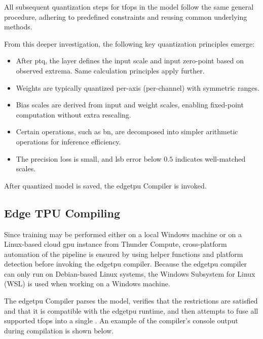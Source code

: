 {All subsequent quantization steps for \glspl{tfop} in the model follow the same general procedure, adhering to predefined constraints and reusing common underlying methods.

From this deeper investigation, the following key quantization principles emerge:
\begin{itemize}
    \item After \gls{ptq}, the  layer defines the input scale and input zero-point based on observed extrema.
    Same calculation principles apply further.
    \item Weights are typically quantized per-axis (per-channel) with symmetric ranges.
    \item Bias scales are derived from input and weight scales, enabling fixed-point computation without extra rescaling.
    \item Certain operations, such as \gls{bn}, are decomposed into simpler arithmetic operations for inference efficiency.
    \item The precision loss is small, and \gls{lsb} error below $0.5$ indicates well-matched scales.
\end{itemize}

After quantized model is saved, the \gls{edgetpu} Compiler is invoked.

\clearpage
\subsection{Edge TPU Compiling}

Since training may be performed either on a local Windows machine or on a Linux-based cloud \gls{gpu} instance from Thunder Compute,
cross-platform automation of the pipeline is ensured by using helper functions and platform detection before invoking the \gls{edgetpu} compiler.
Because the \gls{edgetpu} compiler can only run on Debian-based Linux systems, the Windows Subsystem for Linux (WSL) is used when working on a Windows machine.

The \gls{edgetpu} Compiler parses the  model, verifies that the restrictions are satisfied and that it is compatible with the \gls{edgetpu} runtime,
and then attempts to fuse all supported \glspl{tfop} into a single .
An example of the compiler's console output during compilation is shown below.


}
